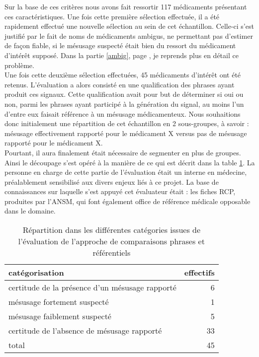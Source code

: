 \documentclass[a4paper, 12pt, openany, oneside, abstract=on]{article} %
\begin{document}
Sur la base de ces critères nous avons fait ressortir 117 médicaments présentant ces caractéristiques.
Une fois cette première sélection effectuée, il a été rapidement effectué une nouvelle sélection au sein de cet échantillon. Celle-ci s'est justifié par le fait de noms de médicaments ambigus, ne permettant pas d'estimer de façon fiable, si le mésusage suspecté était bien du ressort du médicament d'intérêt supposé. Dans la partie \ref{ambig}, page \pageref{ambig}, je reprends plus en détail ce problème.\\
Une fois cette deuxième sélection effectuées, 45 médicaments d'intérêt ont été retenus. L'évaluation a alors consisté en une qualification des phrases ayant produit ces signaux. Cette qualification avait pour but de déterminer si oui ou non, parmi les phrases ayant participé à la génération du signal, au moins l'un d'entre eux faisait référence à un mésusage médicamenteux. Nous souhaitions donc initialement une répartition de cet échantillon en 2 sous-groupes, à savoir : mésusage effectivement rapporté pour le médicament X versus pas de mésusage rapporté pour le médicament X.\\
Pourtant, il aura finalement était nécessaire de segmenter en plus de groupes. Ainsi le découpage s'est opéré à la manière de ce qui est décrit dans la table \ref{table:EffEvalRank}.
La personne en charge de cette partie de l'évaluation était un interne en médecine, préalablement sensibilisé aux divers enjeux liés à ce projet. La base de connaissances sur laquelle s'est appuyé cet évaluateur était : les fiches RCP, produites par l'ANSM, qui font également office de référence médicale opposable dans le domaine.

\begin{table}[H]
\centering
\begin{tabular}{@{}lr@{}}
\toprule
catégorisation                                  & effectifs \\ \midrule
certitude de la présence d'un mésusage rapporté & 6         \\
mésusage fortement suspecté                     & 1         \\
mésusage faiblement suspecté                    & 5         \\
certitude de l'absence de mésusage rapporté     & 33        \\ \midrule
total                                           & 45    
\end{tabular}
\caption{Répartition dans les différentes catégories issues de l'évaluation de l'approche de comparaisons phrases et référentiels}
\label{table:EffEvalRank}
\end{table}
\end{document}

